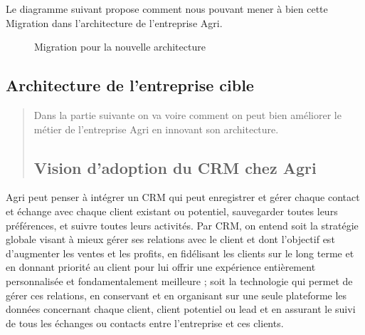 \documentclass[a4paper]{report}
\begin{document}
\begin{doublespace}
Le diagramme suivant propose comment nous pouvant mener à bien cette
Migration dans l'architecture de l'entreprise Agri.

\begin{figure}[H] 
	\begin{center}
		\caption{Migration pour la nouvelle architecture}
	\end{center}
\end{figure}

\subsection{Architecture de l'entreprise cible}

\begin{quote}
Dans la partie suivante on va voire comment on peut bien améliorer le
métier de l'entreprise Agri en innovant son architecture.

\subsection{Vision d'adoption du CRM chez Agri}
\end{quote}

Agri peut penser à intégrer un CRM qui peut enregistrer et gérer chaque
contact et échange avec chaque client existant ou potentiel, sauvegarder
toutes leurs préférences, et suivre toutes leurs activités. Par CRM, on
entend soit la stratégie globale visant à mieux gérer ses relations avec
le client et dont l'objectif est d'augmenter les ventes et les profits,
en fidélisant les clients sur le long terme et en donnant priorité au
client pour lui offrir une expérience entièrement personnalisée et
fondamentalement meilleure ; soit la technologie qui permet de gérer ces
relations, en conservant et en organisant sur une seule plateforme les
données concernant chaque client, client potentiel ou lead et en
assurant le suivi de tous les échanges ou contacts entre l'entreprise et
ces clients.


\end{doublespace}
\end{document}
